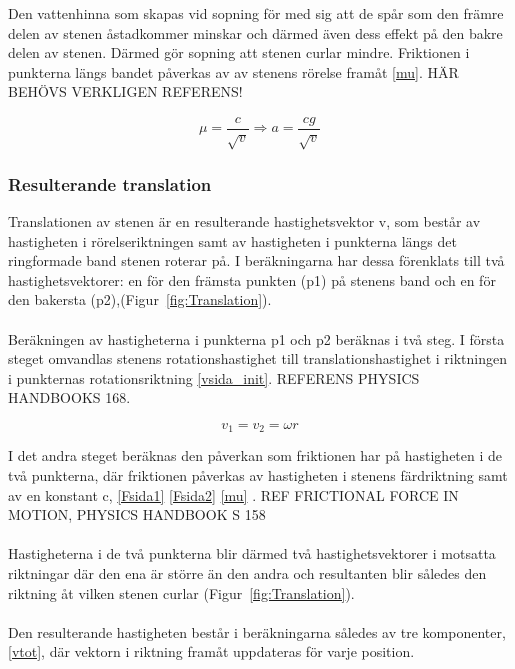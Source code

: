 \documentclass[11pt]{article} %
\begin{document}
Den vattenhinna som skapas vid sopning för med sig att de spår som den främre delen av stenen åstadkommer minskar och därmed  även dess effekt på den bakre delen av stenen. Därmed gör sopning att stenen curlar mindre. Friktionen i punkterna längs bandet påverkas av av stenens rörelse framåt \eqref{mu}. HÄR BEHÖVS VERKLIGEN REFERENS!     

\begin{equation}\label{mu} 
\mu=\frac{c}{\sqrt{v}} \Rightarrow a = \frac{cg}{\sqrt{v}}
\end{equation}

\subsubsection{Resulterande translation}

Translationen av stenen är en resulterande hastighetsvektor v, som består av hastigheten i rörelseriktningen samt av hastigheten i punkterna längs det ringformade band stenen roterar på. I beräkningarna har dessa förenklats till två hastighetsvektorer: en för den främsta punkten (p1)  på stenens band och en för den bakersta (p2),(Figur~\ref{fig:Translation}). 
\\\\Beräkningen av hastigheterna i punkterna p1 och p2 beräknas i två steg. I första steget omvandlas stenens rotationshastighet till translationshastighet i riktningen i punkternas rotationsriktning \eqref{vsida_init}. REFERENS PHYSICS HANDBOOKS 168.
 
\begin{equation}\label{vsida_init}
 v_1 = v_2 = \omega r
 \end{equation}

I det andra steget beräknas den påverkan som friktionen har på hastigheten i de två punkterna, där friktionen påverkas av hastigheten i stenens färdriktning samt av en konstant c,  \eqref{Fsida1} \eqref{Fsida2} \eqref{mu} . 
REF FRICTIONAL FORCE IN MOTION, PHYSICS HANDBOOK S 158
\\\\Hastigheterna i de två punkterna blir därmed två hastighetsvektorer i motsatta riktningar där den ena är större än den andra och resultanten blir således den riktning åt vilken stenen curlar (Figur~\ref{fig:Translation}). 
\\\\Den resulterande hastigheten består i beräkningarna således av tre komponenter, \eqref{vtot}, där vektorn i riktning framåt uppdateras för varje position. 
\end{document}
